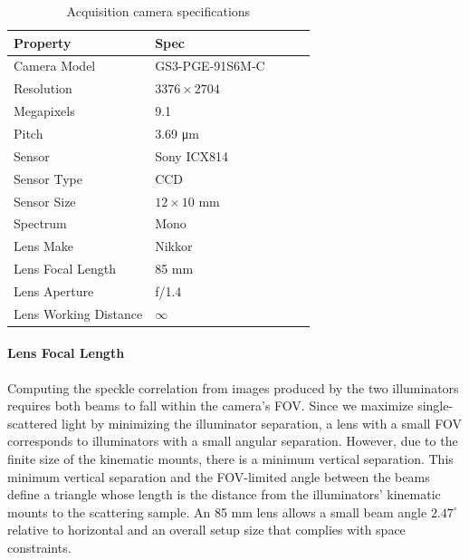 \begin{table}[htbp]
    \renewcommand{\arraystretch}{1.25}
    \caption{Acquisition camera specifications}
    \begin{center}
        \begin{tabular}{ l l l l l }
        \toprule[2pt]
         \textbf{Property} & \textbf{Spec} \\
         \midrule[0.75pt]
         Camera Model & GS3-PGE-91S6M-C \\
         Resolution & $3376 \times 2704$ \\
         Megapixels & 9.1 \\
         Pitch & 3.69 \si{\um} \\
         Sensor & Sony ICX814 \\
         Sensor Type & CCD \\
         Sensor Size & $12 \times 10$ \si{\mm} \\
         Spectrum & Mono \\
         Lens Make & Nikkor \\
         Lens Focal Length & 85 \si{\mm} \\
         Lens Aperture & f/1.4 \\
         Lens Working Distance & $\infty$ \\
         \bottomrule[2pt]
        \end{tabular}
        \label{tab:cpu-gpu}
    \end{center}
\end{table}

\paragraph{Lens Focal Length} Computing the speckle correlation from images produced by the two illuminators requires both beams to fall within the camera's FOV. Since we maximize single-scattered light by minimizing the illuminator separation, a lens with a small FOV corresponds to illuminators with a small angular separation. However, due to the finite size of the kinematic mounts, there is a minimum vertical separation. This minimum vertical separation and the FOV-limited angle between the beams define a triangle whose length is the distance from the illuminators' kinematic mounts to the scattering sample. An 85 mm lens allows a small beam angle $2.47^\circ$ relative to horizontal and an overall setup size that complies with space constraints.

